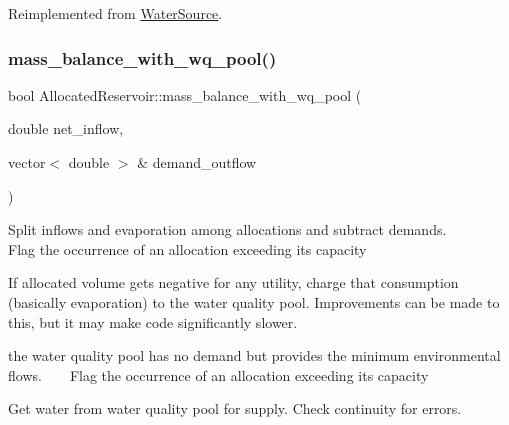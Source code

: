 Reimplemented from \mbox{\hyperlink{classWaterSource_a71cb8bd481bbce0089aa78dcd1c3309a}{Water\+Source}}.

\mbox{\label{classAllocatedReservoir_a9d025365aa42dfff13a0aac8ea7863fa}} 
\subsubsection{\texorpdfstring{mass\+\_\+balance\+\_\+with\+\_\+wq\+\_\+pool()}{mass\_balance\_with\_wq\_pool()}}
{\footnotesize\ttfamily bool Allocated\+Reservoir\+::mass\+\_\+balance\+\_\+with\+\_\+wq\+\_\+pool (\begin{DoxyParamCaption}\item[{double}]{net\+\_\+inflow,  }\item[{vector$<$ double $>$ \&}]{demand\+\_\+outflow }\end{DoxyParamCaption})}

Split inflows and evaporation among allocations and subtract demands. ~\newline
~\newline
~\newline
~\newline
~\newline
 Flag the occurrence of an allocation exceeding its capacity

If allocated volume gets negative for any utility, charge that consumption (basically evaporation) to the water quality pool. Improvements can be made to this, but it may make code significantly slower.

the water quality pool has no demand but provides the minimum environmental flows. ~\newline
~\newline
 Flag the occurrence of an allocation exceeding its capacity

Get water from water quality pool for supply. Check continuity for errors. \mbox{\label{classAllocatedReservoir_ac719b30d5a83ba19ea722449ce9580e1}} 
